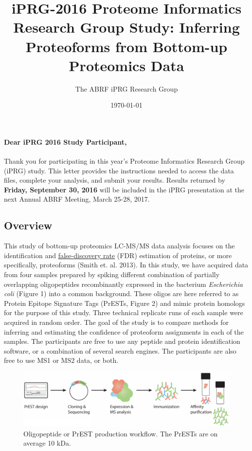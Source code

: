 \documentclass[a4paper,12pt]{article}
\title{iPRG-2016 Proteome Informatics Research Group Study: Inferring Proteoforms from Bottom-up Proteomics Data}
\author{The ABRF iPRG Research Group}
\date{\today}
\begin{document}
\maketitle
\textbf{Dear iPRG 2016 Study Participant,}\\
\\
Thank you for participating in this year's Proteome Informatics Research Group (iPRG) study. This letter provides the instructions needed to access the data files, complete your analysis, and submit your results. Results returned by \textbf{Friday, September 30, 2016} will be included in the iPRG presentation at the next Annual ABRF Meeting, March 25-28, 2017.

\subsection*{Overview}
This study of bottom-up proteomics LC-MS/MS data analysis focuses on the identification and \href{https://en.wikipedia.org/wiki/False_discovery_rate}{false-discovery rate} (FDR) estimation of proteins, or more specifically, proteoforms (Smith et. al. 2013). In this study, we have acquired data from four samples prepared by spiking different combination of partially overlapping oligopeptides recombinantly expressed in the bacterium \textit{Escherichia coli} (Figure 1) into a common background. These oligos are here referred to as Protein Epitope Signature Tags (PrESTs, Figure 2) and mimic protein homologs for the purpose of this study. Three technical replicate runs of each sample were acquired in random order. The goal of the study is to compare methods for inferring and estimating the confidence of proteoform assignments in each of the samples. The participants are free to use any peptide and protein identification software, or a combination of several search engines. The participants are also free to use MS1 or MS2 data, or both. \clearpage
\begin{figure}[h]
\includegraphics[width=13cm]{Figure_1}
\centering
\caption{Oligopeptide or PrEST production workflow. The PrESTs are on average 10 kDa.}
\end{figure}
\end{document}
